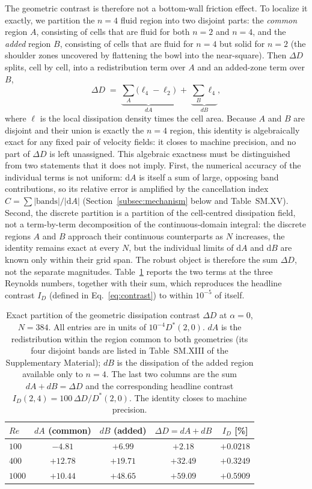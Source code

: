 The geometric contrast is therefore not a bottom-wall friction effect. To localize it exactly, we partition the $n=4$ fluid region into two disjoint parts: the \emph{common} region $A$, consisting of cells that are fluid for both $n=2$ and $n=4$, and the \emph{added} region $B$, consisting of cells that are fluid for $n=4$ but solid for $n=2$ (the shoulder zones uncovered by flattening the bowl into the near-square). Then $\Delta D$ splits, cell by cell, into a redistribution term over $A$ and an added-zone term over $B$,
\begin{equation}
\Delta D \;=\; \underbrace{\sum_{A}\big(\ell_4-\ell_2\big)}_{dA}\;+\;\underbrace{\sum_{B}\ell_4}_{dB},
\end{equation}
where $\ell$ is the local dissipation density times the cell area. Because $A$ and $B$ are disjoint and their union is exactly the $n=4$ region, this identity is algebraically exact for any fixed pair of velocity fields: it closes to machine precision, and no part of $\Delta D$ is left unassigned. This algebraic exactness must be distinguished from two statements that it does not imply. First, the numerical accuracy of the individual terms is not uniform: $\mathrm{d}A$ is itself a sum of large, opposing band contributions, so its relative error is amplified by the cancellation index $C=\sum|\text{bands}|/|\mathrm{d}A|$ (Section~\ref{subsec:mechanism} below and Table~SM.XV). Second, the discrete partition is a partition of the cell-centred dissipation field, not a term-by-term decomposition of the continuous-domain integral: the discrete regions $A$ and $B$ approach their continuous counterparts as $N$ increases, the identity remains exact at every $N$, but the individual limits of $\mathrm{d}A$ and $\mathrm{d}B$ are known only within their grid span. The robust object is therefore the sum $\Delta D$, not the separate magnitudes. Table~\ref{tab:layers} reports the two terms at the three Reynolds numbers, together with their sum, which reproduces the headline contrast $I_D$ (defined in Eq.~\ref{eq:contrast}) to within $10^{-5}$ of itself.

\begin{table}[t]
\centering
\caption{Exact partition of the geometric dissipation contrast $\Delta D$ at $\alpha=0$, $N=384$. All entries are in units of $10^{-4}D^*(2,0)$. $dA$ is the redistribution within the region common to both geometries (its four disjoint bands are listed in Table~SM.XIII of the Supplementary Material); $dB$ is the dissipation of the added region available only to $n=4$. The last two columns are the sum $dA+dB=\Delta D$ and the corresponding headline contrast $I_D(2,4)=100\,\Delta D/D^*(2,0)$. The identity closes to machine precision.}
\label{tab:layers}
\begin{tabular}{@{}lcccc@{}}
\hline
$Re$ & $dA$ (common) & $dB$ (added) & $\Delta D=dA+dB$ & $I_D$ [\%] \\
\hline
$100$  & $-4.81$ & $+6.99$ & $+2.18$ & $+0.0218$ \\
$400$  & $+12.78$ & $+19.71$ & $+32.49$ & $+0.3249$ \\
$1000$ & $+10.44$ & $+48.65$ & $+59.09$ & $+0.5909$ \\
\hline
\end{tabular}
\end{table}

